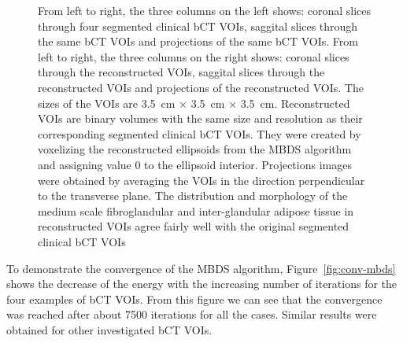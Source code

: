 \documentclass[journal]{IEEEtran}
\begin{document}
\begin{figure}[!htb]

  \caption{From left to right, the three columns on the left shows:
    coronal slices through four segmented clinical bCT VOIs, saggital
    slices through the same bCT VOIs and projections of the same bCT
    VOIs. From left to right, the three columns on the right shows:
    coronal slices through the reconstructed VOIs, saggital slices
    through the reconstructed VOIs and projections of the
    reconstructed VOIs. The sizes of the VOIs are \SI{3.5}{\cm}
    $\times$ \SI{3.5}{\cm} $\times$ \SI{3.5}{\cm}. Reconstructed VOIs
    are binary volumes with the same size and resolution as their
    corresponding segmented clinical bCT VOIs. They were created by
    voxelizing the reconstructed ellipsoids from the MBDS algorithm
    and assigning value 0 to the ellipsoid interior. Projections
    images were obtained by averaging the VOIs in the direction
    perpendicular to the transverse plane. The distribution and
    morphology of the medium scale fibroglandular and inter-glandular
    adipose tissue in reconstructed VOIs agree fairly well with the
    original segmented clinical bCT VOIs}
  \label{fig:bct-datasets-recon}

\end{figure}

To demonstrate the convergence of the MBDS algorithm,
Figure~\ref{fig:conv-mbds} shows the decrease of the energy with the
increasing number of iterations for the four examples of bCT
VOIs. From this figure we can see that the convergence was reached
after about 7500 iterations for all the cases. Similar results were
obtained for other investigated bCT VOIs.
\end{document}
